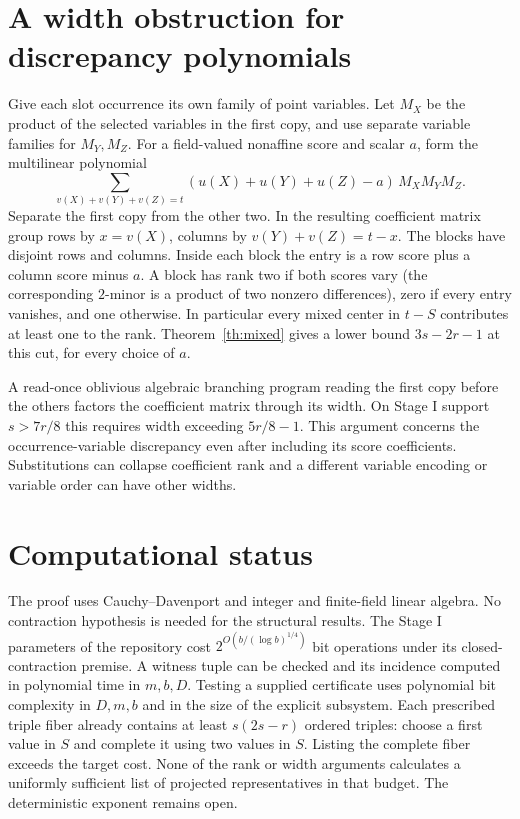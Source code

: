 \documentclass[11pt]{article}
\begin{document}
\section{A width obstruction for discrepancy polynomials}
Give each slot occurrence its own family of point variables. Let $M_X$ be the product of the selected variables in the first copy, and use separate variable families for $M_Y,M_Z$. For a field-valued nonaffine score and scalar $a$, form the multilinear polynomial
\[
 \sum_{v(X)+v(Y)+v(Z)=t}
 (u(X)+u(Y)+u(Z)-a)\,M_XM_YM_Z .
\]
Separate the first copy from the other two. In the resulting coefficient matrix group rows by $x=v(X)$, columns by $v(Y)+v(Z)=t-x$. The blocks have disjoint rows and columns. Inside each block the entry is a row score plus a column score minus $a$. A block has rank two if both scores vary (the corresponding $2$-minor is a product of two nonzero differences), zero if every entry vanishes, and one otherwise. In particular every mixed center in $t-S$ contributes at least one to the rank. Theorem~\ref{th:mixed} gives a lower bound $3s-2r-1$ at this cut, for every choice of $a$.

A read-once oblivious algebraic branching program reading the first copy before the others factors the coefficient matrix through its width. On Stage I support $s>7r/8$ this requires width exceeding $5r/8-1$. This argument concerns the occurrence-variable discrepancy even after including its score coefficients. Substitutions can collapse coefficient rank and a different variable encoding or variable order can have other widths.

\section{Computational status}
The proof uses Cauchy--Davenport and integer and finite-field linear algebra. No contraction hypothesis is needed for the structural results. The Stage I parameters of the repository cost $2^{O(b/(\log b)^{1/4})}$ bit operations under its closed-contraction premise. A witness tuple can be checked and its incidence computed in polynomial time in $m,b,D$. Testing a supplied certificate uses polynomial bit complexity in $D,m,b$ and in the size of the explicit subsystem. Each prescribed triple fiber already contains at least $s(2s-r)$ ordered triples: choose a first value in $S$ and complete it using two values in $S$. Listing the complete fiber exceeds the target cost. None of the rank or width arguments calculates a uniformly sufficient list of projected representatives in that budget. The deterministic exponent remains open.
\end{document}
